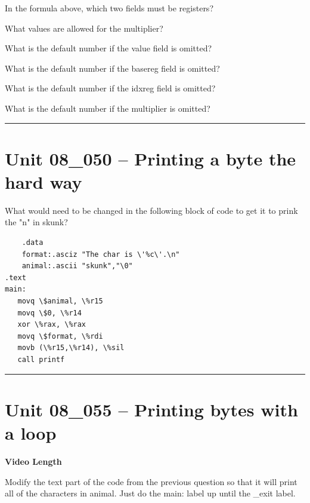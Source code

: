 \documentclass[letterpaper,12pt]{exam}
\newcommand{\unit}{Unit 08}
\begin{document}
\begin{questions}
\begin{samepage}
    \question In the formula above, which two fields must be registers?
    \vspace{5mm}
\end{samepage}
\begin{samepage}
    \question What values are allowed for the multiplier?
    \vspace{5mm}
\end{samepage}
\par
\begin{samepage}
    \question What is the default number if the value field is omitted? 
    \vspace{5mm}
\end{samepage}
\par
\begin{samepage}
    \question What is the default number if the basereg field is omitted? 
    \vspace{5mm}
\end{samepage}
\begin{samepage}
    \question What is the default number if the idxreg field is omitted? 
    \vspace{5mm}
\end{samepage}
\begin{samepage}
    \question What is the default number if the multiplier is omitted? 
    \vspace{5mm}
\end{samepage}

      
\rule{0.5\textwidth}{.4pt} %
\section*{\unit\_050 -- Printing a byte the hard way}
\begin{samepage}
    \question What would need to be changed in the following block of code to get it to prink the "n" in skunk?
\begin{verbatim}
    .data
    format:.asciz "The char is \'%c\'.\n"
    animal:.ascii "skunk","\0"
.text
main:
   movq \$animal, \%r15
   movq \$0, \%r14
   xor \%rax, \%rax
   movq \$format, \%rdi
   movb (\%r15,\%r14), \%sil
   call printf
\end{verbatim}

\end{samepage}
\par
\rule{0.5\textwidth}{.4pt} %
\section*{\unit\_055 -- Printing bytes with a loop }
\par{\selectfont\textbf{Video Length }}
\begin{samepage}
    \question Modify the text part of the code from the previous question so that it will print all of the characters in animal.  Just do the main: label up until the \_exit label.
    \vspace{65mm}
\end{samepage}


\end{questions}
\end{document}
